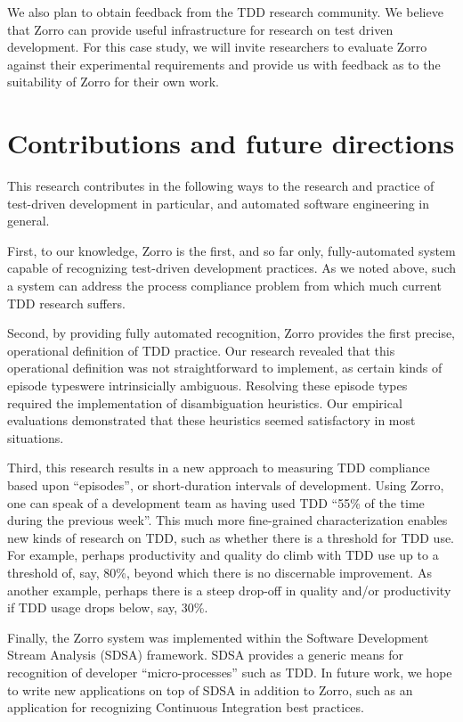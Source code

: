 \documentclass[smallextended]{svjour3}     %
\begin{document}
We also plan to obtain feedback from the TDD research community.  We believe
that Zorro can provide useful infrastructure for research on test driven
development.  For this case study, we will invite researchers to 
evaluate Zorro against their experimental requirements and provide us with 
feedback as to the suitability of Zorro for their own work. 

\section{Contributions and future directions}
\label{sec:conclusions}

This research contributes in the following ways to the research and
practice of test-driven development in particular, and automated software
engineering in general.

First, to our knowledge, Zorro is the first, and so far only,
fully-automated system capable of recognizing test-driven development
practices.  As we noted above, such a system can address the 
process compliance problem from which much current TDD research suffers. 

Second, by providing fully automated recognition, Zorro provides the first
precise, operational definition of TDD practice.  Our research revealed
that this operational definition was not straightforward to implement, as
certain kinds of episode typeswere intrinsicially ambiguous.  Resolving
these episode types required the implementation of disambiguation
heuristics. Our empirical evaluations demonstrated that these heuristics
seemed satisfactory in most situations.

Third, this research results in a new approach to measuring TDD compliance
based upon ``episodes'', or short-duration intervals of development.  Using
Zorro, one can speak of a development team as having used TDD ``55\% of the
time during the previous week''.  This much more fine-grained
characterization enables new kinds of research on TDD, such as whether
there is a threshold for TDD use.  For example, perhaps productivity and
quality do climb with TDD use up to a threshold of, say, 80\%, beyond which
there is no discernable improvement.  As another example, perhaps there is
a steep drop-off in quality and/or productivity if TDD usage drops below,
say, 30\%.

Finally, the Zorro system was implemented within the Software Development
Stream Analysis (SDSA) framework.  SDSA provides a generic means for
recognition of developer ``micro-processes'' such as TDD.  In future work,
we hope to write new applications on top of SDSA in addition to Zorro, such
as an application for recognizing Continuous Integration best practices.
\end{document}
